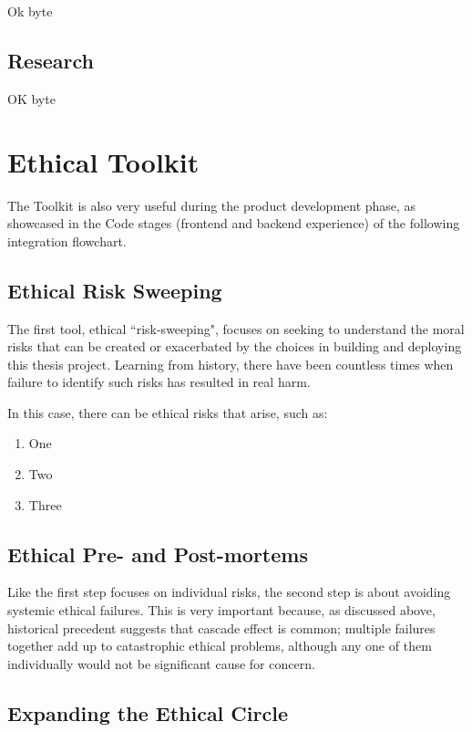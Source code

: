 \documentclass{article}
\begin{document}
Ok byte

\subsection{Research}

OK byte

\section{Ethical Toolkit}

The Toolkit is also very useful during the product development phase, as showcased in the Code stages (frontend and backend experience) of the following integration flowchart.

\subsection{Ethical Risk Sweeping}

The first tool, ethical ``risk-sweeping", focuses on seeking to understand the moral risks that can be created or exacerbated by the choices in building and deploying this thesis project. Learning from history, there have been countless times when failure to identify such risks has resulted in real harm.

In this case, there can be ethical risks that arise, such as:

\begin{enumerate}
 \item One
 \item Two
 \item Three
\end{enumerate}

\subsection{Ethical Pre- and Post-mortems}

Like the first step focuses on individual risks, the second step is about avoiding systemic ethical failures. This is very important because, as discussed above, historical precedent suggests that cascade effect is common; multiple failures together add up to catastrophic ethical problems, although any one of them individually would not be significant cause for concern.



\subsection{Expanding the Ethical Circle}
\end{document}
